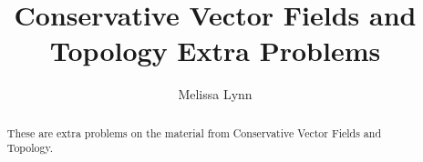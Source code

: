 \documentclass{ximera}
\title{Conservative Vector Fields and Topology Extra Problems}
\author{Melissa Lynn}
\begin{document}
  
\begin{abstract}  
These are extra problems on the material from Conservative Vector Fields and Topology.
\end{abstract}  
\maketitle
\end{document}
